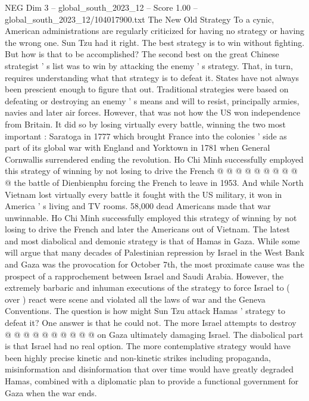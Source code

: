 \begin{textsample}{NEG Dim 3 – global\_south\_2023\_12 – Score 1.00 – global\_south\_2023\_12/104017900.txt}  \label{ex:f3_neg_018}
The New Old Strategy To a cynic, American administrations are regularly criticized for having no strategy or having the wrong one.
Sun Tzu had it right.
The best strategy is to win without fighting.
But how is that to be accomplished?
The second best on the great Chinese strategist ' s list was to win by attacking the enemy ' s strategy.
That, in turn, requires understanding what that strategy is to defeat it.
States have not always been prescient enough to figure that out.
Traditional strategies were based on defeating or destroying an enemy ' s means and will to resist, principally armies, navies and later air forces.
However, that was not how the US won independence from Britain.
It did so by losing virtually every battle, winning the two most important : Saratoga in 1777 which brought France into the colonies ' side as part of its global war with England and Yorktown in 1781 when General Cornwallis surrendered ending the revolution.
Ho Chi Minh successfully employed this strategy of winning by not losing to drive the French @ @ @ @ @ @ @ @ @ @ the battle of Dienbienphu forcing the French to leave in 1953.
And while North Vietnam lost virtually every battle it fought with the US military, it won in America ' s living and TV rooms. 58,000 dead Americans made that war unwinnable.
Ho Chi Minh successfully employed this strategy of winning by not losing to drive the French and later the Americans out of Vietnam.
The latest and most diabolical and demonic strategy is that of Hamas in Gaza.
While some will argue that many decades of Palestinian repression by Israel in the West Bank and Gaza was the provocation for October 7th, the most proximate cause was the prospect of a rapprochement between Israel and Saudi Arabia.
However, the extremely barbaric and inhuman executions of the strategy to force Israel to ( over ) react were scene and violated all the laws of war and the Geneva Conventions.
The question is how might Sun Tzu attack Hamas ' strategy to defeat it?
One answer is that he could not.
The more Israel attempts to destroy @ @ @ @ @ @ @ @ @ @ on Gaza ultimately damaging Israel.
The diabolical part is that Israel had no real option.
The more contemplative strategy would have been highly precise kinetic and non-kinetic strikes including propaganda, misinformation and disinformation that over time would have greatly degraded Hamas, combined with a diplomatic plan to provide a functional government for Gaza when the war ends.

\end{textsample}
